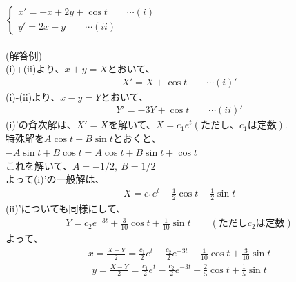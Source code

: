 \documentclass[a4paper,11pt,fleqn]{jarticle}
\begin{document}
\subsubsection{}
$\left\{ \begin{array}{l}
x'=-x+2y+\cos t\qquad \cdots (i) \\
y'=2x-y \qquad \cdots (ii)
\end{array} \right.$\\
\\
(解答例)\\
(i)+(ii)より、$x+y=X$とおいて、
\begin{eqnarray*}
X'=X+\cos t \qquad \cdots (i)'
\end{eqnarray*}
(i)-(ii)より、$x-y=Y$とおいて、
\begin{eqnarray*}
Y'=-3Y+\cos t \qquad \cdots (ii)'
\end{eqnarray*}
(i)'の斉次解は、$X'=X$を解いて、$X=c_1e^t(ただし、c_1は定数)$.\\
特殊解を$A\cos t+B\sin t$とおくと、\\
$-A\sin t+B\cos t=A\cos t+B\sin t+\cos t$\\
これを解いて、$A=-1/2,~B=1/2$\\
よって(i)'の一般解は、
\begin{eqnarray*}
X=c_1e^t-\frac{1}{2}\cos t+\frac{1}{2}\sin t
\end{eqnarray*}
(ii)'についても同様にして、
\begin{eqnarray*}
Y=c_2e^{-3t}+\frac{3}{10}\cos t+\frac{1}{10}\sin t\qquad (ただしc_2は定数)
\end{eqnarray*}
よって、
\begin{eqnarray*}
x=\frac{X+Y}{2}=\frac{c_1}{2}e^t+\frac{c_2}{2}e^{-3t}-\frac{1}{10}\cos t+\frac{3}{10}\sin t
\end{eqnarray*}
\begin{eqnarray*}
y=\frac{X-Y}{2}=\frac{c_1}{2}e^t-\frac{c_2}{2}e^{-3t}-\frac{2}{5}\cos t+\frac{1}{5}\sin t
\end{eqnarray*}

\newpage
\end{document}
